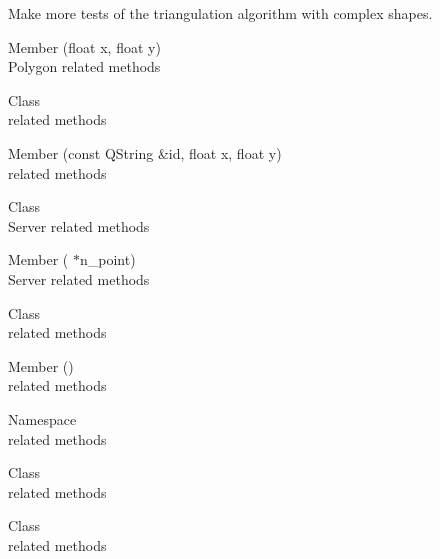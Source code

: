 \begin{DoxyRefList}
\label{todo__todo000011}%
%
Make more tests of the triangulation algorithm with complex shapes.  
\item[Member \doxylink{class_my_polygon_a855da59df5a1b049e5011b890b48227d}{My\+Polygon\+::add\+Vertex} (float x, float y)]\hfill \\
\label{todo__todo000010}%
%
Polygon related methods  
\item[Class \doxylink{class_node}{Node} ]\hfill \\
\label{todo__todo000013}%
%
 related methods  
\item[Member \doxylink{class_node_a2791559360966137a418c4506b087aa7}{Node\+::Node} (const QString \&id, float x, float y)]\hfill \\
\label{todo__todo000012}%
%
 related methods  
\item[Class \doxylink{classserver}{server} ]\hfill \\
\label{todo__todo000015}%
%
Server related methods  
\item[Member \doxylink{classserver_ae034429a5a7b00634c6881444bccf38a}{server\+::server} (\doxylink{class_vector2_d}{Vector2D} \texorpdfstring{$\ast$}{*}n\+\_\+point)]\hfill \\
\label{todo__todo000014}%
%
Server related methods  
\item[Class \doxylink{class_triangle}{Triangle} ]\hfill \\
\label{todo__todo000017}%
%
 related methods  
\item[Member \doxylink{class_triangle_abc1d2380e0daf2b13ef96e3e89f01a2d}{Triangle\+::compute\+Circle} ()]\hfill \\
\label{todo__todo000016}%
%
 related methods  
\item[Namespace \doxylink{namespace_ui}{Ui} ]\hfill \\
\label{todo__todo000009}%
%
 related methods  
\item[Class \doxylink{class_vector2_d}{Vector2D} ]\hfill \\
\label{todo__todo000018}%
%
 related methods  
\item[Class \doxylink{class_voronoi}{Voronoi} ]\hfill \\
\label{todo__todo000019}%
%
 related methods 
\end{DoxyRefList}